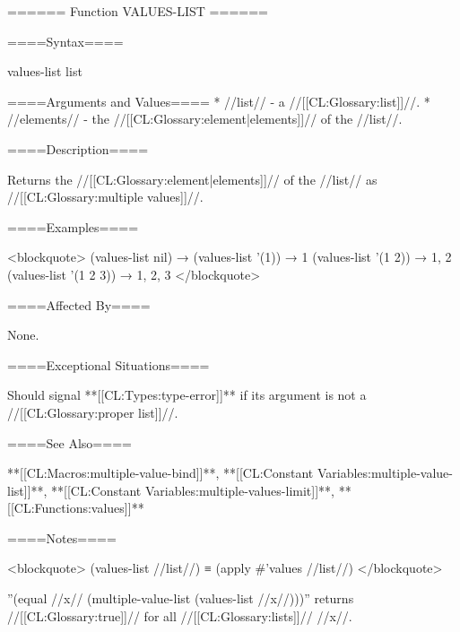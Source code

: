 ====== Function VALUES-LIST ======

====Syntax====

\DefunWithValues values-list {list} {}

====Arguments and Values====
  * //list// - a //[[CL:Glossary:list]]//.
  * //elements// - the //[[CL:Glossary:element|elements]]// of the //list//.

====Description====

Returns the //[[CL:Glossary:element|elements]]// of the //list// as //[[CL:Glossary:multiple values]]//.

====Examples====

<blockquote> (values-list nil) → \novalues (values-list '(1)) → 1 (values-list '(1 2)) → 1, 2 (values-list '(1 2 3)) → 1, 2, 3 </blockquote>

====Affected By====

None.

====Exceptional Situations====

Should signal **[[CL:Types:type-error]]** if its argument is not a //[[CL:Glossary:proper list]]//.

====See Also====

**[[CL:Macros:multiple-value-bind]]**, **[[CL:Constant Variables:multiple-value-list]]**, **[[CL:Constant Variables:multiple-values-limit]]**, **[[CL:Functions:values]]**

====Notes====

<blockquote> (values-list //list//) ≡ (apply #'values //list//) </blockquote>

''(equal //x// (multiple-value-list (values-list //x//)))'' returns //[[CL:Glossary:true]]// for all //[[CL:Glossary:lists]]// //x//.

